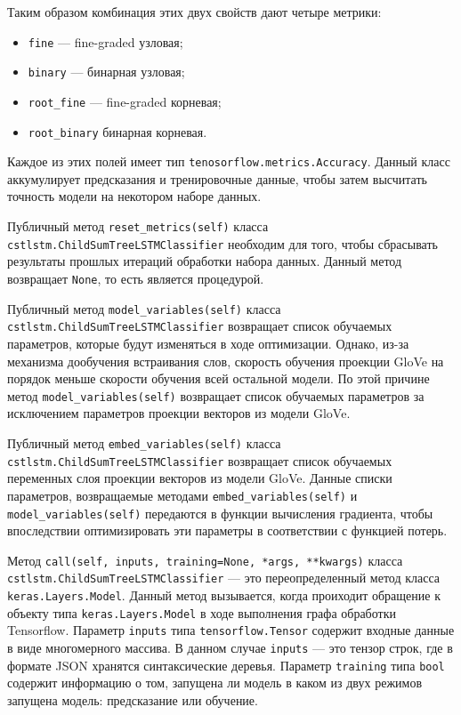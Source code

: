 Таким образом комбинация этих двух свойств дают четыре метрики:
\begin{itemize}
\item \texttt{fine} --- fine-graded узловая;
\item \texttt{binary} --- бинарная узловая;
\item \texttt{root\_fine} --- fine-graded корневая;
\item \texttt{root\_binary} бинарная корневая.
\end{itemize}

Каждое из этих полей имеет тип \texttt{tenosorflow.metrics.Accuracy}. Данный класс аккумулирует предсказания и тренировочные данные, чтобы затем высчитать точность модели на некотором наборе данных.

Публичный метод \texttt{reset\_metrics(self)} класса \texttt{cstlstm.ChildSumTre\-eLSTMClassifier} необходим для того, чтобы сбрасывать результаты прошлых итераций обработки набора данных. Данный метод возвращает \texttt{None}, то есть является процедурой.

Публичный метод \texttt{model\_variables(self)} класса \texttt{cstlstm.ChildSum\-TreeLSTMClassifier} возвращает список обучаемых параметров, которые будут изменяться в ходе оптимизации. Однако, из-за механизма дообучения встраивания слов, скорость обучения проекции GloVe на порядок меньше скорости обучения всей остальной модели. По этой причине метод \texttt{model\_va\-riables(self)} возвращает список обучаемых параметров за исключением параметров проекции векторов из модели GloVe.

Публичный метод \texttt{embed\_variables(self)} класса \texttt{cstlstm.ChildSum\-TreeLSTMClassifier} возвращает список обучаемых переменных слоя проекции векторов из модели GloVe. Данные списки параметров, возвращаемые методами \texttt{embed\_variables(self)} и \texttt{model\_variables(self)} передаются в функции вычисления градиента, чтобы впоследствии оптимизировать эти параметры в соответствии с функцией потерь.

Метод \texttt{call(self, inputs, training=None, *args, **kwargs)} класса \texttt{cstlstm.ChildSumTreeLSTMClassifier} --- это переопределенный метод класса \texttt{keras.Layers.Model}. Данный метод вызывается, когда проиходит обращение к объекту типа \texttt{keras.Layers.Model} в ходе выполнения графа обработки Tensorflow. Параметр \texttt{inputs} типа \texttt{tensorflow.Tensor} содержит входные данные в виде многомерного массива. В данном случае \texttt{inputs} --- это тензор строк, где в формате JSON хранятся синтаксические деревья. Параметр \texttt{training} типа \texttt{bool} содержит информацию о том, запущена ли модель в каком из двух режимов запущена модель: предсказание или обучение.

